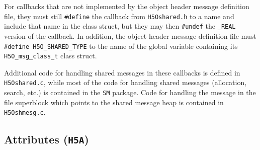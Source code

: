 \begin{itemize}
For callbacks that are not implemented by the object header message definition file, they must still \texttt{\#define} the callback from \texttt{H5Oshared.h} to a name and include that name in the class struct, but they may then \texttt{\#undef} the \texttt{\_REAL} version of the callback. In addition, the object header message definition file must \texttt{\#define H5O\_SHARED\_TYPE} to the name of the global variable containing its \texttt{H5O\_msg\_class\_t} class struct.

Additional code for handling shared messages in these callbacks is defined in \texttt{H5Oshared.c}, while most of the code for handling shared messages (allocation, search, etc.) is contained in the \texttt{SM} package. Code for handling the message in the file superblock which points to the shared message heap is contained in \texttt{H5Oshmesg.c}.



\end{itemize}

\subsection{Attributes (\texttt{H5A})}




